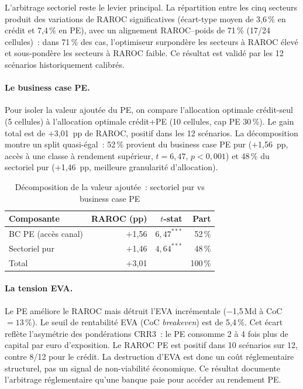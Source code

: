 \documentclass[10pt, a4paper, oneside]{report}
\theoremstyle{definition}
\begin{document}
L'arbitrage sectoriel reste le levier principal. La répartition entre les cinq secteurs produit des variations de RAROC significatives (écart-type moyen de 3{,}6\,\% en crédit et 7{,}4\,\% en PE), avec un alignement RAROC--poids de 71\,\% (17/24 cellules)~: dans 71\,\% des cas, l'optimiseur surpondère les secteurs à RAROC élevé et sous-pondère les secteurs à RAROC faible. Ce résultat est validé par les 12 scénarios historiquement calibrés.

\paragraph{Le business case PE.} Pour isoler la valeur ajoutée du PE, on compare l'allocation optimale crédit-seul (5 cellules) à l'allocation optimale crédit+PE (10 cellules, cap PE 30\,\%). Le gain total est de $+$3{,}01~pp de RAROC, positif dans les 12 scénarios. La décomposition montre un split quasi-égal~: 52\,\% provient du business case PE pur ($+$1{,}56~pp, accès à une classe à rendement supérieur, $t = 6{,}47$, $p < 0{,}001$) et 48\,\% du sectoriel pur ($+$1{,}46~pp, meilleure granularité d'allocation).

\begin{table}[htbp]
\centering
\caption{Décomposition de la valeur ajoutée~: sectoriel pur vs business case PE}
\label{tab:bc-pe}
\small
\begin{tabular}{lrrr}
\toprule
Composante & RAROC (pp) & $t$-stat & Part \\
\midrule
BC PE (accès canal) & $+$1{,}56 & $6{,}47^{***}$ & 52\,\% \\
Sectoriel pur & $+$1{,}46 & $4{,}64^{***}$ & 48\,\% \\
\midrule
Total & $+$3{,}01 & & 100\,\% \\
\bottomrule
\end{tabular}
\end{table}

\paragraph{La tension EVA.} Le PE améliore le RAROC mais détruit l'EVA incrémentale ($-$1{,}5\,Md à CoC $= 13\,\%$). Le seuil de rentabilité EVA (CoC \emph{breakeven}) est de 5{,}4\,\%. Cet écart reflète l'asymétrie des pondérations CRR3~: le PE consomme 2 à 4 fois plus de capital par euro d'exposition. Le RAROC PE est positif dans 10 scénarios sur 12, contre 8/12 pour le crédit. La destruction d'EVA est donc un coût réglementaire structurel, pas un signal de non-viabilité économique. Ce résultat documente l'arbitrage réglementaire qu'une banque paie pour accéder au rendement PE.
\end{document}
